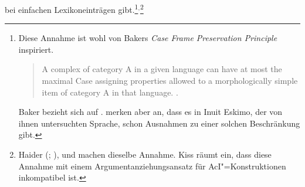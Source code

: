 bei einfachen Lexikoneinträgen gibt.\footnote{
  Diese Annahme ist wohl von Bakers \emph{Case Frame Preservation Principle}
  inspiriert.
  \begin{quote}
    A complex \xnull of category A in a given language can have
    at most the maximal Case assigning properties allowed to a morphologically
    simple item of category A in that language. \citep[]{Baker88a}.
  \end{quote}%
  Baker bezieht sich auf . \citet[]{GM85a} merken aber
  an, dass es in Inuit Eskimo, der von ihnen untersuchten Sprache, schon
  Ausnahmen zu einer solchen Beschränkung gibt.%
}$^,$\footnote{
        Haider (\citeyear[]{Haider86c}; \citeyear[]{Haider90b}),
        \citet[]{Kiss95a} und
        \citet[]{Kathol2000a} machen dieselbe Annahme.
        Kiss räumt ein, dass diese Annahme mit einem Argumentanziehungsansatz für
        AcI"=Konstruktionen inkompatibel ist.

}
